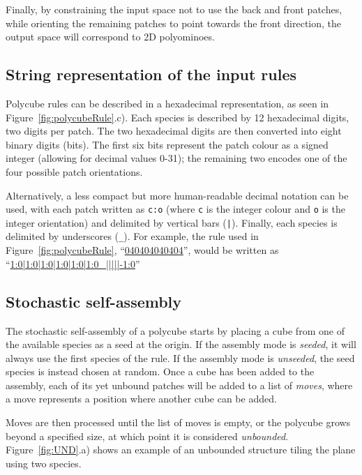 Finally, by constraining the input space not to use the back and front patches, while orienting the remaining patches to point towards the front direction, the output space will correspond to 2D polyominoes.

\subsection{String representation of the input rules}
\label{sec:string_repr}

Polycube rules can be described in a hexadecimal representation, as seen in Figure~\ref{fig:polycubeRule}.c). Each species is described by 12 hexadecimal digits, two digits per patch. The two hexadecimal digits are then converted into eight binary digits (bits). The first six bits represent the patch colour as a signed integer (allowing for decimal values 0-31); the remaining two encodes one of the four possible patch orientations.

Alternatively, a less compact but more human-readable decimal notation can be used, with each patch written as \texttt{c:o} (where \texttt{c} is the integer colour and \texttt{o} is the integer orientation) and delimited by vertical bars (\texttt{|}). Finally, each species is delimited by underscores (\texttt{\_}). For example, the rule used in Figure~\ref{fig:polycubeRule}, ``\href{https://akodiat.github.io/polycubes?rule=040404040404000000000084}{040404040404}'', would be written as ``\href{https://akodiat.github.io/polycubes?decRule=1:0|1:0|1:0|1:0|1:0|1:0_|||||-1:0}{1:0|1:0|1:0|1:0|1:0|1:0\_|||||-1:0}''

\subsection{Stochastic self-assembly}
\label{sec:stochastic_assembly}

The stochastic self-assembly of a polycube starts by placing a cube from one of the available species as a seed at the origin. If the assembly mode is \emph{seeded}, it will always use the first species of the rule. If the assembly mode is \emph{unseeded}, the seed species is instead chosen at random. Once a cube has been added to the assembly, each of its yet unbound patches will be added to a list of \emph{moves}, where a move represents a position where another cube can be added.

Moves are then processed until the list of moves is empty, or the polycube grows beyond a specified size, at which point it is considered \emph{unbounded}. Figure~\ref{fig:UND}.a) shows an example of an unbounded structure tiling the plane using two species.

